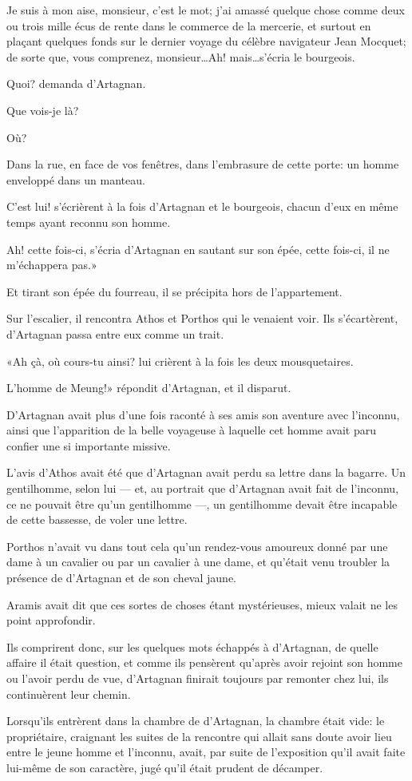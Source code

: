 \speak  Je suis à mon aise, monsieur, c'est le mot; j'ai amassé quelque chose comme deux ou trois mille écus de rente dans le commerce de la mercerie, et surtout en plaçant quelques fonds sur le dernier voyage du célèbre navigateur Jean Mocquet; de sorte que, vous comprenez, monsieur\dots Ah! mais\dots s'écria le bourgeois. 

\speak  Quoi? demanda d'Artagnan. 

\speak  Que vois-je là? 

\speak  Où? 

\speak  Dans la rue, en face de vos fenêtres, dans l'embrasure de cette porte: un homme enveloppé dans un manteau. 

\speak  C'est lui! s'écrièrent à la fois d'Artagnan et le bourgeois, chacun d'eux en même temps ayant reconnu son homme. 

\speak  Ah! cette fois-ci, s'écria d'Artagnan en sautant sur son épée, cette fois-ci, il ne m'échappera pas.» 

Et tirant son épée du fourreau, il se précipita hors de l'appartement. 

Sur l'escalier, il rencontra Athos et Porthos qui le venaient voir. Ils s'écartèrent, d'Artagnan passa entre eux comme un trait. 

«Ah çà, où cours-tu ainsi? lui crièrent à la fois les deux mousquetaires. 

\speak  L'homme de Meung!» répondit d'Artagnan, et il disparut. 

D'Artagnan avait plus d'une fois raconté à ses amis son aventure avec l'inconnu, ainsi que l'apparition de la belle voyageuse à laquelle cet homme avait paru confier une si importante missive. 

L'avis d'Athos avait été que d'Artagnan avait perdu sa lettre dans la bagarre. Un gentilhomme, selon lui --- et, au portrait que d'Artagnan avait fait de l'inconnu, ce ne pouvait être qu'un gentilhomme ---, un gentilhomme devait être incapable de cette bassesse, de voler une lettre. 

Porthos n'avait vu dans tout cela qu'un rendez-vous amoureux donné par une dame à un cavalier ou par un cavalier à une dame, et qu'était venu troubler la présence de d'Artagnan et de son cheval jaune. 

Aramis avait dit que ces sortes de choses étant mystérieuses, mieux valait ne les point approfondir. 

Ils comprirent donc, sur les quelques mots échappés à d'Artagnan, de quelle affaire il était question, et comme ils pensèrent qu'après avoir rejoint son homme ou l'avoir perdu de vue, d'Artagnan finirait toujours par remonter chez lui, ils continuèrent leur chemin. 

Lorsqu'ils entrèrent dans la chambre de d'Artagnan, la chambre était vide: le propriétaire, craignant les suites de la rencontre qui allait sans doute avoir lieu entre le jeune homme et l'inconnu, avait, par suite de l'exposition qu'il avait faite lui-même de son caractère, jugé qu'il était prudent de décamper.